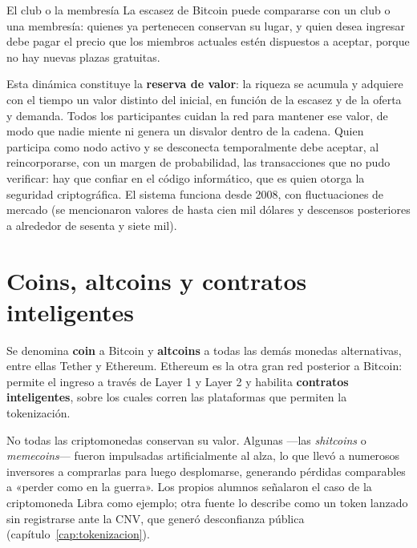 \documentclass[12pt,oneside]{book}
\begin{document}
\begin{example}{El club o la membresía}
La escasez de Bitcoin puede compararse con un club o una membresía: quienes ya pertenecen conservan su lugar, y quien desea ingresar debe pagar el precio que los miembros actuales estén dispuestos a aceptar, porque no hay nuevas plazas gratuitas.
\end{example}

Esta dinámica constituye la \textbf{reserva de valor}: la riqueza se acumula y adquiere con el tiempo un valor distinto del inicial, en función de la escasez y de la oferta y demanda. Todos los participantes cuidan la red para mantener ese valor, de modo que nadie miente ni genera un disvalor dentro de la cadena. Quien participa como nodo activo y se desconecta temporalmente debe aceptar, al reincorporarse, con un margen de probabilidad, las transacciones que no pudo verificar: hay que confiar en el código informático, que es quien otorga la seguridad criptográfica. El sistema funciona desde 2008, con fluctuaciones de mercado (se mencionaron valores de hasta cien mil dólares y descensos posteriores a alrededor de sesenta y siete mil).

\section{Coins, altcoins y contratos inteligentes}

Se denomina \textbf{coin} a Bitcoin y \textbf{altcoins} a todas las demás monedas alternativas, entre ellas Tether y Ethereum. Ethereum es la otra gran red posterior a Bitcoin: permite el ingreso a través de Layer 1 y Layer 2 y habilita \textbf{contratos inteligentes}, sobre los cuales corren las plataformas que permiten la tokenización.

No todas las criptomonedas conservan su valor. Algunas ---las \emph{shitcoins} o \emph{memecoins}--- fueron impulsadas artificialmente al alza, lo que llevó a numerosos inversores a comprarlas para luego desplomarse, generando pérdidas comparables a «perder como en la guerra». Los propios alumnos señalaron el caso de la criptomoneda Libra como ejemplo; otra fuente lo describe como un token lanzado sin registrarse ante la CNV, que generó desconfianza pública (capítulo~\ref{cap:tokenizacion}).
\end{document}
